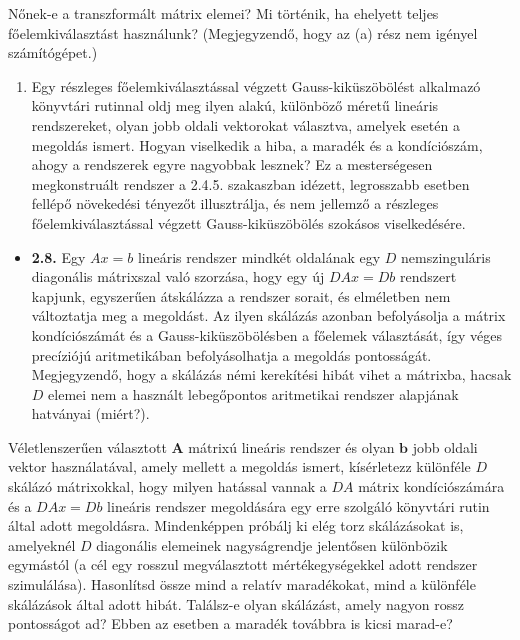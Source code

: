 \documentclass[
  magyar,
  11pt]{article}
\providecommand{\tightlist}{%
  \setlength{\itemsep}{0pt}\setlength{\parskip}{0pt}}
\providecommand{\boldsymbol}[1]{\mathbf{#1}}
\begin{document}
Nőnek-e a transzformált mátrix elemei? Mi történik, ha ehelyett teljes
főelemkiválasztást használunk? (Megjegyzendő, hogy az (a) rész nem
igényel számítógépet.)

\begin{enumerate}
\def\labelenumi{(\alph{enumi})}
\setcounter{enumi}{1}
\tightlist
\item
  Egy részleges főelemkiválasztással végzett Gauss-kiküszöbölést
  alkalmazó könyvtári rutinnal oldj meg ilyen alakú, különböző méretű
  lineáris rendszereket, olyan jobb oldali vektorokat választva, amelyek
  esetén a megoldás ismert. Hogyan viselkedik a hiba, a maradék és a
  kondíciószám, ahogy a rendszerek egyre nagyobbak lesznek? Ez a
  mesterségesen megkonstruált rendszer a 2.4.5. szakaszban idézett,
  legrosszabb esetben fellépő növekedési tényezőt illusztrálja, és nem
  jellemző a részleges főelemkiválasztással végzett Gauss-kiküszöbölés
  szokásos viselkedésére.
\end{enumerate}

\begin{itemize}
\tightlist
\item
  \textbf{2.8.} Egy \(Ax = b\) lineáris rendszer mindkét oldalának egy
  \(D\) nemszinguláris diagonális mátrixszal való szorzása, hogy egy új
  \(DAx = Db\) rendszert kapjunk, egyszerűen átskálázza a rendszer
  sorait, és elméletben nem változtatja meg a megoldást. Az ilyen
  skálázás azonban befolyásolja a mátrix kondíciószámát és a
  Gauss-kiküszöbölésben a főelemek választását, így véges precíziójú
  aritmetikában befolyásolhatja a megoldás pontosságát. Megjegyzendő,
  hogy a skálázás némi kerekítési hibát vihet a mátrixba, hacsak \(D\)
  elemei nem a használt lebegőpontos aritmetikai rendszer alapjának
  hatványai (miért?).
\end{itemize}

Véletlenszerűen választott \(\boldsymbol{A}\) mátrixú lineáris rendszer
és olyan \(\boldsymbol{b}\) jobb oldali vektor használatával, amely
mellett a megoldás ismert, kísérletezz különféle \(D\) skálázó
mátrixokkal, hogy milyen hatással vannak a \(DA\) mátrix kondíciószámára
és a \(DAx = Db\) lineáris rendszer megoldására egy erre szolgáló
könyvtári rutin által adott megoldásra. Mindenképpen próbálj ki elég
torz skálázásokat is, amelyeknél \(D\) diagonális elemeinek
nagyságrendje jelentősen különbözik egymástól (a cél egy rosszul
megválasztott mértékegységekkel adott rendszer szimulálása). Hasonlítsd
össze mind a relatív maradékokat, mind a különféle skálázások által
adott hibát. Találsz-e olyan skálázást, amely nagyon rossz pontosságot
ad? Ebben az esetben a maradék továbbra is kicsi marad-e?
\end{document}

